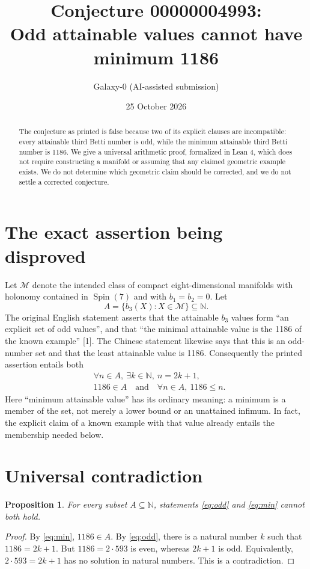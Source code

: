 \documentclass[11pt]{article}
\title{Conjecture 00000004993:\\Odd attainable values cannot have minimum 1186}
\author{Galaxy-0 \quad (AI-assisted submission)}
\date{25 October 2026}
\newtheorem{proposition}{Proposition}
\begin{document}
\maketitle
\begin{abstract}
The conjecture as printed is false because two of its explicit clauses are
incompatible: every attainable third Betti number is odd, while the minimum
attainable third Betti number is 1186. We give a universal arithmetic proof,
formalized in Lean 4, which does not require constructing a manifold or assuming
that any claimed geometric example exists. We do not determine which geometric
claim should be corrected, and we do not settle a corrected conjecture.
\end{abstract}

\section{The exact assertion being disproved}
Let $\mathcal M$ denote the intended class of compact eight-dimensional manifolds
with holonomy contained in $\operatorname{Spin}(7)$ and with $b_1=b_2=0$. Let
\[
 A=\{b_3(X):X\in\mathcal M\}\subseteq\mathbb N.
\]
The original English statement asserts that the attainable $b_3$ values form
``an explicit set of odd values'', and that ``the minimal attainable value is
the 1186 of the known example'' [1]. The Chinese statement likewise says that
this is an odd-number set and that the least attainable value is 1186.
Consequently the printed assertion entails both
\begin{align}
 &\forall n\in A,\ \exists k\in\mathbb N,\ n=2k+1, \label{eq:odd}\\
 &1186\in A\quad\text{and}\quad\forall n\in A,\ 1186\le n. \label{eq:min}
\end{align}
Here ``minimum attainable value'' has its ordinary meaning: a minimum is a
member of the set, not merely a lower bound or an unattained infimum. In fact,
the explicit claim of a known example with that value already entails the
membership needed below.

\section{Universal contradiction}
\begin{proposition}
For every subset $A\subseteq\mathbb N$, statements \eqref{eq:odd} and
\eqref{eq:min} cannot both hold.
\end{proposition}
\begin{proof}
By \eqref{eq:min}, $1186\in A$. By \eqref{eq:odd}, there is a natural number $k$
such that $1186=2k+1$. But $1186=2\cdot593$ is even, whereas $2k+1$ is odd.
Equivalently, $2\cdot593=2k+1$ has no solution in natural numbers. This is a
contradiction.
\end{proof}
\end{document}
